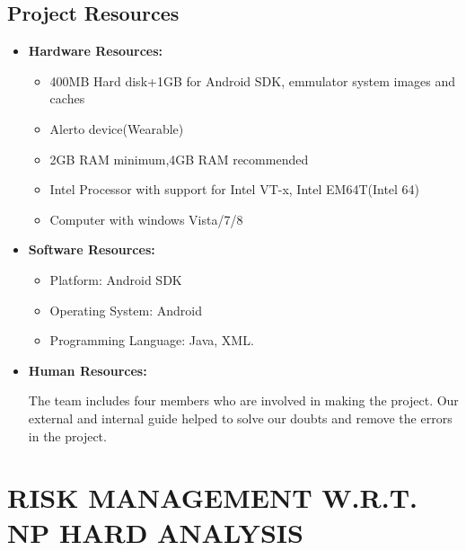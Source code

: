\documentclass[12pt,a4paper]{report}
\begin{document}
\subsection{Project Resources}
\begin{itemize}
	\item \textbf{Hardware Resources:}
	\begin{itemize}
\item	400MB Hard disk+1GB for Android SDK, emmulator system images and caches
	\item Alerto device(Wearable)
	\item 2GB RAM minimum,4GB RAM recommended
	\item Intel Processor with support for Intel VT-x, Intel EM64T(Intel 64)
	\item Computer  with windows Vista/7/8
    \end{itemize}
	\item \textbf{Software Resources:}
	\begin{itemize}
	\item Platform: Android SDK
	\item Operating System: Android
	\item Programming Language: Java, XML.
    \end{itemize}
	\item \textbf{Human Resources:}
	
	The team includes four members who are involved in making the project. Our external and internal guide helped to solve our doubts and remove the errors in the project.
\end{itemize}
\section{RISK MANAGEMENT W.R.T. NP HARD ANALYSIS}
\end{document}
